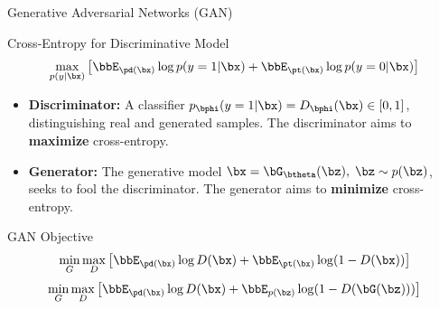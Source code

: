 \documentclass{beamer}
\begin{document}
\begin{frame}{Generative Adversarial Networks (GAN)}
	\begin{block}{Cross-Entropy for Discriminative Model}
		\vspace{-0.3cm}
		\[
			\max_{p(y | \bx)} \left[\bbE_{\pd(\bx)} \log p(y = 1 | \bx) + \bbE_{\pt(\bx)} \log p(y = 0 | \bx) \right] 
		\]
	\end{block}
	\eqpause
	\begin{itemize}
		\item \textbf{Discriminator:} A classifier $p_{\bphi}(y = 1 | \bx) = D_{\bphi}(\bx) \in [0, 1]$, distinguishing real and generated samples. The discriminator aims to \textbf{maximize} cross-entropy.
		\item \textbf{Generator:} The generative model $\bx = \bG_{\btheta}(\bz),\; \bz \sim p(\bz)$, seeks to fool the discriminator. The generator aims to \textbf{minimize} cross-entropy.
	\end{itemize}
	\eqpause
	\begin{block}{GAN Objective}
		\vspace{-0.5cm}
		\[
			\min_{G} \max_D \left[ \bbE_{\pd(\bx)} \log D(\bx) + \bbE_{\pt(\bx)} \log (1 - D(\bx)) \right] 
		\]
		\eqpause
		\[
			\min_{G} \max_D \left[ \bbE_{\pd(\bx)} \log D(\bx) + \bbE_{p(\bz)} \log (1 - D(\bG(\bz))) \right]
		\]
	\end{block}
\end{frame}
\end{document}
